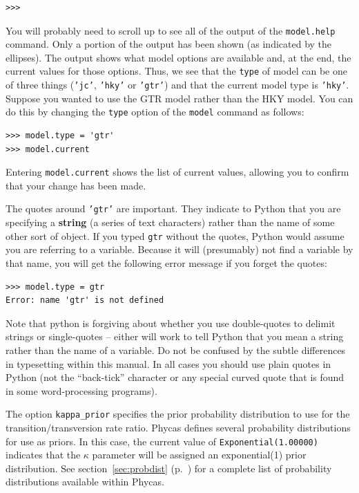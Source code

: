 \documentclass[10pt]{article}
\newcommand{\code}[1]{{\tt #1}}					%
\newcommand{\cmd}[1]{{\tt \small #1}\index{#1}}	%
\newcommand{\opt}[1]{{\tt \small #1}\index{#1}}	%
\newcommand{\optval}[1]{{\tt #1}}					%
\newcommand{\term}[1]{{\bfseries #1}\index{#1}}	%
\begin{document}
\begin{verbatim}
>>>
\end{verbatim}

You will probably need to scroll up to see all of the output of the \cmd{model.help} command. Only a portion of the output has been shown (as indicated by the ellipses). The output shows what model options are available and, at the end, the current values for those options. Thus, we see that the \opt{type} of model can be one of three things (\optval{'jc'}, \optval{'hky'} or \optval{'gtr'}) and that the current model type is \optval{'hky'}. Suppose you wanted to use the GTR model rather than the HKY model. You can do this by changing the \opt{type} option of the \cmd{model} command as follows:
\begin{verbatim}
>>> model.type = 'gtr'
>>> model.current
\end{verbatim}
Entering \code{model.current} shows the list of current values, allowing you to confirm that your change has been made.

The quotes around \optval{'gtr'} are important. They indicate to Python that you are specifying a \term{string} (a series of text characters) rather than the name of some other sort of object. If you typed \code{gtr} without the quotes, Python would assume you are referring to a variable. Because it will (presumably) not find a variable by that name, you will get the following error message if you forget the quotes:
\begin{verbatim}
>>> model.type = gtr
Error: name 'gtr' is not defined
\end{verbatim}
Note that python is forgiving about whether you use double-quotes to delimit strings or single-quotes -- either will work to tell Python that you mean a string rather than the name of a variable.
Do not be confused by the subtle differences in typesetting within this manual. In all cases you should use plain quotes in Python (not the ``back-tick'' character or any special curved quote that is found in some word-processing programs).

The option \opt{kappa\_prior} specifies the prior probability distribution to use for the transition/transversion rate ratio. Phycas defines several probability distributions for use as priors. In this case, the current value of \optval{Exponential(1.00000)} indicates that the $\kappa$ parameter will be assigned an exponential(1) prior distribution. See section~\ref{sec:probdist} (p.~\pageref{sec:probdist}) for a complete list of probability distributions available within Phycas.
\end{document}

